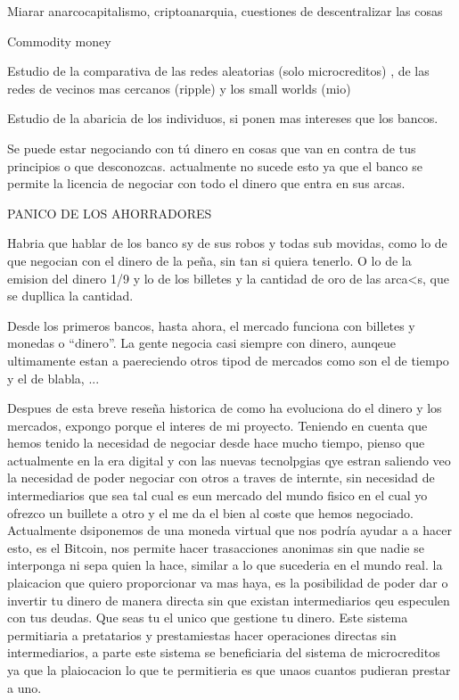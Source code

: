 Miarar anarcocapitalismo, criptoanarquia, cuestiones de descentralizar las cosas

Commodity money

Estudio de la comparativa de las redes aleatorias (solo microcreditos) , de las redes de vecinos mas cercanos (ripple) y los small worlds (mio)

Estudio de la abaricia de los individuos, si ponen mas intereses que los bancos.

Se puede estar negociando con tú dinero en cosas que van en contra de tus principios o que desconozcas. actualmente no sucede esto ya que el banco se permite la licencia de negociar con todo el dinero que entra en sus arcas.

PANICO DE LOS AHORRADORES

Habria que hablar de los banco sy de sus robos y todas sub movidas, como lo de que negocian con el dinero de la peña, sin tan si quiera tenerlo. O lo de la emision del dinero 1/9 y lo de los billetes y la cantidad de oro de las arca<s, que se dupllica la cantidad.

Desde los primeros bancos, hasta ahora, el mercado funciona con billetes y monedas o ``dinero''. La gente negocia casi siempre con dinero, aunqeue ultimamente estan a paereciendo otros tipod de mercados como son el de tiempo y el de blabla, ...


Despues de esta breve reseña historica de como ha evoluciona do el dinero y los mercados, expongo porque el interes de mi proyecto. Teniendo en cuenta que hemos tenido la necesidad de negociar desde hace mucho tiempo, pienso que actualmente en la era digital y con las nuevas tecnolpgias qye estran saliendo veo la necesidad de poder negociar con otros a traves de internte, sin necesidad de intermediarios que sea tal cual es eun mercado del mundo fisico en el cual yo ofrezco un buillete a otro y el me da el bien al coste que hemos negociado. Actualmente dsiponemos de una moneda virtual que nos podría ayudar a a hacer esto, es el Bitcoin, nos permite hacer trasacciones anonimas sin que nadie se interponga ni sepa quien la hace, similar a lo que sucederia en el mundo real. la plaicacion que quiero proporcionar va mas haya, es la posibilidad de poder dar o invertir tu dinero de manera directa sin que existan intermediarios qeu especulen con tus deudas. Que seas tu el unico que gestione tu dinero. Este sistema permitiaria a pretatarios y prestamiestas hacer operaciones directas sin intermediarios, a parte este sistema se beneficiaria del sistema de microcreditos ya que la plaiocacion lo que te permitieria es que unaos cuantos pudieran prestar a uno.


